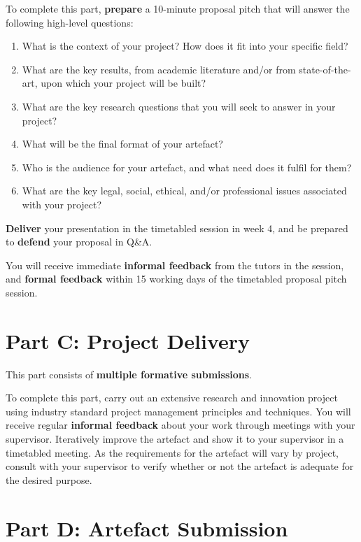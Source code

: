 To complete this part, \textbf{prepare} a 10-minute proposal pitch that will answer the following high-level questions:
\begin{enumerate}[label=(\roman*)]
	\item What is the context of your project? How does it fit into your specific field?
	\item What are the key results, from academic literature and/or from state-of-the-art, upon which your project will be built?
	\item What are the key research questions that you will seek to answer in your project?
	\item What will be the final format of your artefact?
	\item Who is the audience for your artefact, and what need does it fulfil for them?
	\item What are the key legal, social, ethical, and/or professional issues associated with your project?
\end{enumerate}

\textbf{Deliver} your presentation in the timetabled session in week 4, and be prepared to \textbf{defend} your proposal in Q\&A.

You will receive immediate \textbf{informal feedback} from the tutors in the session, and \textbf{formal feedback} within 15 working days of the timetabled proposal pitch session.

\section*{Part C: Project Delivery}

This part consists of \textbf{multiple formative submissions}.

To complete this part, carry out an extensive research and innovation project using industry standard project management principles and techniques. You will receive regular \textbf{informal feedback} about your work through meetings with your supervisor. Iteratively improve the artefact and show it to your supervisor in a timetabled meeting. As the requirements for the artefact will vary by project, consult with your supervisor to verify whether or not the artefact is adequate for the desired purpose.

\section*{Part D: Artefact Submission}

